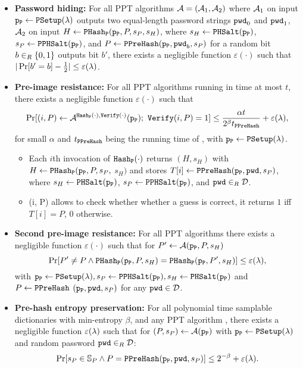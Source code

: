 \begin{itemize}
  \item \textbf{Password hiding:} 
    For all \ac{PPT} algorithms $\mathcal{A}=(\mathcal{A}_1,\mathcal{A}_2)$ where $\mathcal{A}_1$ on input $\mathtt{p_P}\gets\mathtt{PSetup}(\lambda)$ outputs two equal-length password strings $\mathtt{pwd}_0$ and $\mathtt{pwd}_1$, $\mathcal{A}_2$ on input $H\gets\mathtt{PHash_P}(\mathtt{p_P},P,s_P,s_H)$, where $s_H\gets\mathtt{PHSalt}(\mathtt{p_P})$, $s_P\gets\mathtt{PPHSalt}(\mathtt{p_P})$, and $P\gets\mathtt{PPreHash}(\mathtt{p_P},\mathtt{pwd}_b, s_P)$ for a random bit $b\in_R\{0,1\}$ outputs bit $b'$, there exists a negligible function $\varepsilon(\cdot)$ such that
$|\Pr[b'=b]-\frac12|\leq\varepsilon(\lambda)$.

  \item \textbf{Pre-image resistance:}
    For all \ac{PPT} algorithms \cA running in time at most $t$, there exists a negligible function $\varepsilon(\cdot)$ such that
    \[\Pr[(i,P)\gets \mathcal{A}^{\mathtt{Hash_P}(\cdot), \mathtt{Verify}(\cdot)}(\mathtt{p_P});~ \mathtt{Verify}(i,P) = 1]\leq \frac{\alpha t}{2^\beta t_\mathtt{PPreHash}}+\varepsilon(\lambda),\]
    for small $\alpha$ and $t_\mathtt{PPreHash}$ being the running time of \PPreHash, with $\mathtt{p_P}\gets\mathtt{PSetup}(\lambda)$.
    \begin{itemize}
      \item Each $i$th invocation of $\mathtt{Hash_P}(\cdot)$ returns $(H,s_H)$ with $H\gets\mathtt{PHash_P}(\mathtt{p_P},P,s_P,$ $s_H)$ and stores $T[i]\gets\mathtt{PPreHash}(\mathtt{p_P},\mathtt{pwd}, s_P)$, where $s_H\gets\mathtt{PHSalt}(\mathtt{p_P})$, $s_P\gets\mathtt{PPHSalt}(\mathtt{p_P})$, and $\mathtt{pwd}\in_R\mathcal{D}$.
      \item \Verify(i, P) allows \cA to check whether whether a guess is correct, \ie it returns $1$ iff $T[i]=P$, $0$ otherwise. 
    \end{itemize}

\item \textbf{Second pre-image resistance:}
    For all \ac{PPT} algorithms \cA there exists a negligible function $\varepsilon(\cdot)$ such that for $P'\gets \mathcal{A}(\mathtt{p_P}, P, s_H)$
      \[\Pr[P'\not=P \wedge \mathtt{PHash_P}(\mathtt{p_P},P,s_H)=\mathtt{PHash_P}(\mathtt{p_P},P',s_H)] \leq \varepsilon(\lambda),\]
      with $\mathtt{p_P}\gets\mathtt{PSetup}(\lambda), s_P\gets\mathtt{PPHSalt}(\mathtt{p_P}), s_H\gets\mathtt{PHSalt}(\mathtt{p_P})$ and $P\gets\mathtt{PPreHash}$ $(\mathtt{p_P}, \mathtt{pwd}, s_P)$ for any $\mathtt{pwd}\in\mathcal{D}$.

\item \textbf{Pre-hash entropy preservation:}
    For all polynomial time samplable dictionaries \cD with min-entropy $\beta$, and any \ac{PPT} algorithm \cA, there exists a negligible function $\varepsilon(\lambda)$ such that for $(P,s_P)\gets \mathcal{A}(\mathtt{p_P})$ with $\mathtt{p_P}\gets\mathtt{PSetup}(\lambda)$ and random password $\mathtt{pwd}\in_R\mathcal{D}$:
      \[\Pr[s_P\in\mathbb{S}_P \wedge P=\mathtt{PPreHash}(\mathtt{p_P},\mathtt{pwd},s_P)] \leq 2^{-\beta} + \varepsilon(\lambda).\]


\end{itemize}
